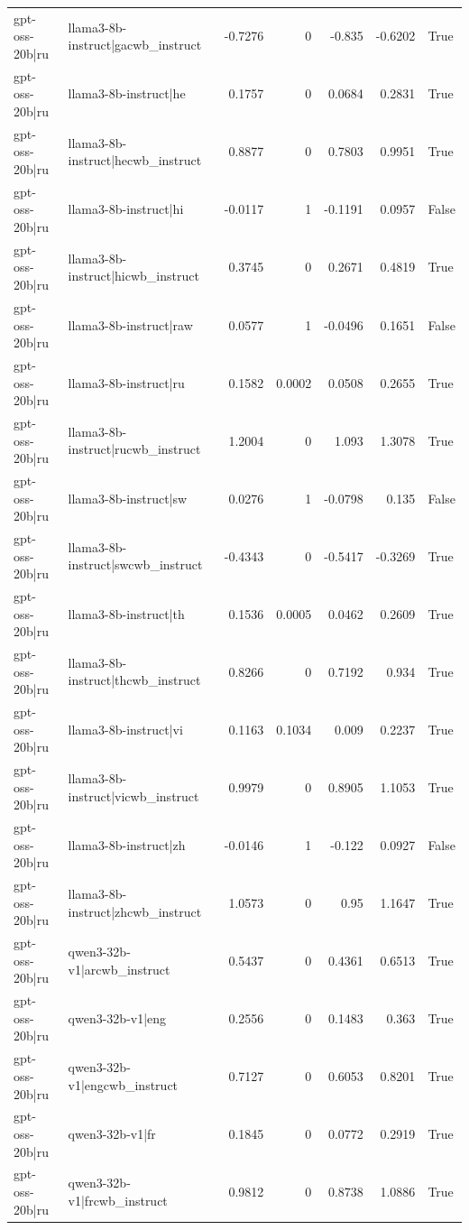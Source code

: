 \begin{table}
\begin{tabular}{l l r r r r l}
gpt-oss-20b|ru & llama3-8b-instruct|gacwb_instruct & -0.7276 & 0 & -0.835 & -0.6202 & True \\
gpt-oss-20b|ru & llama3-8b-instruct|he & 0.1757 & 0 & 0.0684 & 0.2831 & True \\
gpt-oss-20b|ru & llama3-8b-instruct|hecwb_instruct & 0.8877 & 0 & 0.7803 & 0.9951 & True \\
gpt-oss-20b|ru & llama3-8b-instruct|hi & -0.0117 & 1 & -0.1191 & 0.0957 & False \\
gpt-oss-20b|ru & llama3-8b-instruct|hicwb_instruct & 0.3745 & 0 & 0.2671 & 0.4819 & True \\
gpt-oss-20b|ru & llama3-8b-instruct|raw & 0.0577 & 1 & -0.0496 & 0.1651 & False \\
gpt-oss-20b|ru & llama3-8b-instruct|ru & 0.1582 & 0.0002 & 0.0508 & 0.2655 & True \\
gpt-oss-20b|ru & llama3-8b-instruct|rucwb_instruct & 1.2004 & 0 & 1.093 & 1.3078 & True \\
gpt-oss-20b|ru & llama3-8b-instruct|sw & 0.0276 & 1 & -0.0798 & 0.135 & False \\
gpt-oss-20b|ru & llama3-8b-instruct|swcwb_instruct & -0.4343 & 0 & -0.5417 & -0.3269 & True \\
gpt-oss-20b|ru & llama3-8b-instruct|th & 0.1536 & 0.0005 & 0.0462 & 0.2609 & True \\
gpt-oss-20b|ru & llama3-8b-instruct|thcwb_instruct & 0.8266 & 0 & 0.7192 & 0.934 & True \\
gpt-oss-20b|ru & llama3-8b-instruct|vi & 0.1163 & 0.1034 & 0.009 & 0.2237 & True \\
gpt-oss-20b|ru & llama3-8b-instruct|vicwb_instruct & 0.9979 & 0 & 0.8905 & 1.1053 & True \\
gpt-oss-20b|ru & llama3-8b-instruct|zh & -0.0146 & 1 & -0.122 & 0.0927 & False \\
gpt-oss-20b|ru & llama3-8b-instruct|zhcwb_instruct & 1.0573 & 0 & 0.95 & 1.1647 & True \\
gpt-oss-20b|ru & qwen3-32b-v1|arcwb_instruct & 0.5437 & 0 & 0.4361 & 0.6513 & True \\
gpt-oss-20b|ru & qwen3-32b-v1|eng & 0.2556 & 0 & 0.1483 & 0.363 & True \\
gpt-oss-20b|ru & qwen3-32b-v1|engcwb_instruct & 0.7127 & 0 & 0.6053 & 0.8201 & True \\
gpt-oss-20b|ru & qwen3-32b-v1|fr & 0.1845 & 0 & 0.0772 & 0.2919 & True \\
gpt-oss-20b|ru & qwen3-32b-v1|frcwb_instruct & 0.9812 & 0 & 0.8738 & 1.0886 & True \\

\end{tabular}
\end{table}

